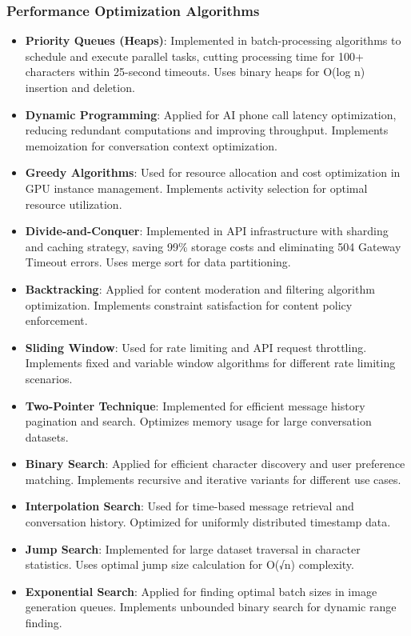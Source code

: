 \documentclass[conference]{IEEEtran}
\begin{document}
\subsubsection{Performance Optimization Algorithms}
\begin{itemize}
\item \textbf{Priority Queues (Heaps)}: Implemented in batch-processing algorithms to schedule and execute parallel tasks, cutting processing time for 100+ characters within 25-second timeouts. Uses binary heaps for O(log n) insertion and deletion.
\item \textbf{Dynamic Programming}: Applied for AI phone call latency optimization, reducing redundant computations and improving throughput. Implements memoization for conversation context optimization.
\item \textbf{Greedy Algorithms}: Used for resource allocation and cost optimization in GPU instance management. Implements activity selection for optimal resource utilization.
\item \textbf{Divide-and-Conquer}: Implemented in API infrastructure with sharding and caching strategy, saving 99\% storage costs and eliminating 504 Gateway Timeout errors. Uses merge sort for data partitioning.
\item \textbf{Backtracking}: Applied for content moderation and filtering algorithm optimization. Implements constraint satisfaction for content policy enforcement.
\item \textbf{Sliding Window}: Used for rate limiting and API request throttling. Implements fixed and variable window algorithms for different rate limiting scenarios.
\item \textbf{Two-Pointer Technique}: Implemented for efficient message history pagination and search. Optimizes memory usage for large conversation datasets.
\item \textbf{Binary Search}: Applied for efficient character discovery and user preference matching. Implements recursive and iterative variants for different use cases.
\item \textbf{Interpolation Search}: Used for time-based message retrieval and conversation history. Optimized for uniformly distributed timestamp data.
\item \textbf{Jump Search}: Implemented for large dataset traversal in character statistics. Uses optimal jump size calculation for O(√n) complexity.
\item \textbf{Exponential Search}: Applied for finding optimal batch sizes in image generation queues. Implements unbounded binary search for dynamic range finding.
\end{itemize}
\end{document}
